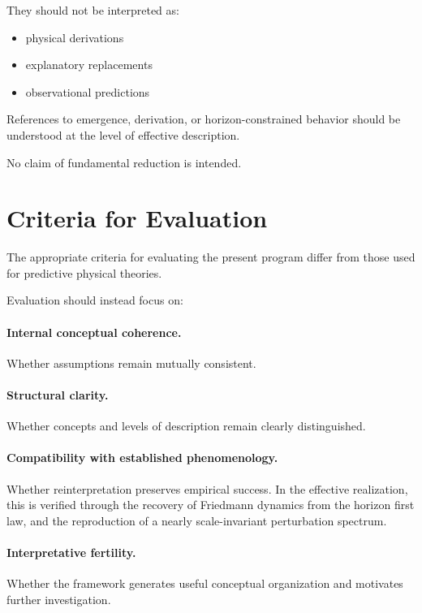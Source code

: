 \documentclass[12pt,a4paper]{article}
\begin{document}
They should not be interpreted as:

\begin{itemize}
  \item physical derivations
  \item explanatory replacements
  \item observational predictions
\end{itemize}

References to emergence, derivation, or horizon-constrained behavior should be understood at the level of effective description.

No claim of fundamental reduction is intended.

\section{Criteria for Evaluation}

The appropriate criteria for evaluating the present program differ from those used for predictive physical theories.

Evaluation should instead focus on:

\paragraph{Internal conceptual coherence.} Whether assumptions remain mutually consistent.

\paragraph{Structural clarity.} Whether concepts and levels of description remain clearly distinguished.

\paragraph{Compatibility with established phenomenology.} Whether reinterpretation preserves empirical success. In the effective realization, this is verified through the recovery of Friedmann dynamics from the horizon first law, and the reproduction of a nearly scale-invariant perturbation spectrum.

\paragraph{Interpretative fertility.} Whether the framework generates useful conceptual organization and motivates further investigation.
\end{document}
